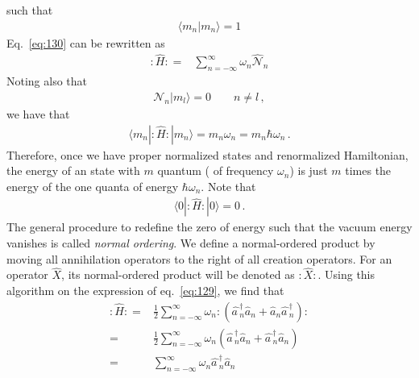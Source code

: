 such that
\begin{align}
    \langle m_n|m_n\rangle=1
\end{align}
Eq.~\eqref{eq:130} can be rewritten as
\begin{align}
  \colon\!\widehat{H}\colon=&\sum_{n=-\infty}^{\infty} \omega_n \widehat{\mathcal{N}}_n
\end{align}
Noting also that
\begin{align}
  \mathcal{N}_n|m_l\rangle=0\qquad n\ne l\,, 
\end{align}
we have that
\begin{align}
  \langle m_n|\colon\!\widehat{H}\colon|m_n\rangle=m_n \omega_n=m_n \hbar\omega_n\,.
\end{align}
Therefore, once we have proper normalized states and renormalized Hamiltonian, the energy of an state with $m$ quantum ( of frequency $\omega_n$) is just $m$ times the energy of the one quanta of energy $\hbar\omega_n$. Note that
\begin{align}
  \langle 0|\colon\!\widehat{H}\colon|0\rangle=0\,.
\end{align}
The general procedure to redefine the zero of energy such that the vacuum energy vanishes is called \emph{normal ordering}. We define a normal-ordered product  by moving all annihilation operators to the right of all creation operators. For an operator $\widehat{X}$, its normal-ordered product will be denoted as $\colon\widehat{X}\colon$. Using this algorithm on the expression of eq.~\eqref{eq:129}, we find that
\begin{align}
\label{eq:133}
  \colon\widehat{H}\colon=&\frac{1}{2}\sum_{n=-\infty}^{\infty} \omega_n \colon(\widehat{a\,}_{n}^\dagger\widehat{a}_{n} +\widehat{a}_{n} \widehat{a\,}_{n}^\dagger)\colon\nonumber\\
=&\frac{1}{2}\sum_{n=-\infty}^{\infty} \omega_n (\widehat{a\,}_{n}^\dagger\widehat{a}_{n} +\widehat{a\,}_{n}^\dagger\widehat{a}_{n} )\nonumber\\
=&\sum_{n=-\infty}^{\infty} \omega_n \widehat{a\,}_{n}^\dagger\widehat{a}_{n}
\end{align}




